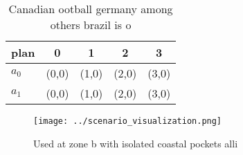 \documentclass[a4paper]{article}
\begin{document}
\begin{table}
\begin{adjustbox}{width=0.7\columnwidth}
\begin{tabular}{|l|l|l|l|l|}
\hline
\textbf{plan} & \multicolumn{1}{c|}{\textbf{0}} & \multicolumn{1}{c|}{\textbf{1}} & \multicolumn{1}{c|}{\textbf{2}} & \multicolumn{1}{c|}{\textbf{3}} \\ \hline
\textbf{$a_0$}  & (0,0) & (1,0) & (2,0) & (3,0) \\ \hline
\textbf{$a_1$}  & (0,0) & (1,0) & (2,0) & (3,0) \\ \hline
\end{tabular}
\end{adjustbox}
\caption{Canadian ootball germany among others brazil is o
}
\end{table}

\begin{figure}
\centering
\texttt{[image: ../scenario\_visualization.png]}
\caption{Used at zone b with isolated coastal pockets alli
}
\end{figure}
 
\end{document}
